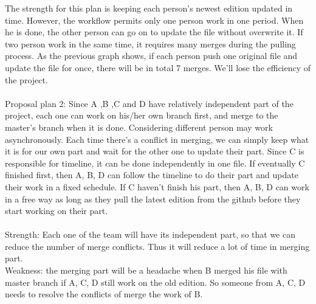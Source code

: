 \documentclass[12pt]{article}
\begin{document}
\newpage
The strength for this plan is keeping each person's newest edition updated in time. However, the workflow permits only one person work in one period. When he is done, the other person can go on to update the file without overwrite it. If two person work in the same time, it requires many merges during the pulling process. As the previous graph shows, if each person push one original file and update the file for once, there will be in total 7 merges. We'll lose the efficiency of the project.\\
\\Proposal plan 2: Since A ,B ,C and D have relatively independent part of the project, each one can work on his/her own branch first, and merge to the master's branch when it is done. Considering different person may work asynchronously. Each time there's a conflict in merging, we can simply keep what it is for our own part and wait for the other one to update their part. Since C is responsible for timeline, it can be done independently in one file. If eventually C finished first, then A, B, D can follow the timeline to do their part and update their work in a fixed schedule. If C haven't finish his part, then A, B, D can work in a free way as long as they pull the latest edition from the github before they start working on their part. \\
\\Strength: Each one of the team will have its independent part, so that we can reduce the number of merge conflicts. Thus it will reduce a lot of time in merging part.
\\Weakness: the merging part will be a headache when B merged his file with master branch if  A, C, D  still work on the old edition. So someone from A, C, D needs to resolve the conflicts of merge the work of B. 

\end{document}
